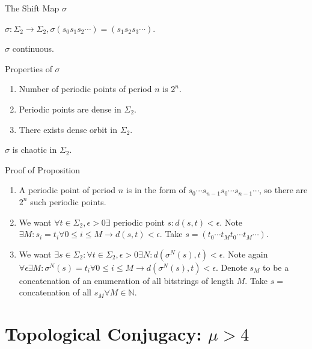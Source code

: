 \documentclass[aspectratio=169]{beamer}
\begin{document}
\begin{frame}{The Shift Map $\sigma$}
\begin{defn}
    $\sigma: \Sigma_2 \rightarrow \Sigma_2, \sigma(s_0s_1s_2\cdots) = (s_1s_2s_3\cdots)$. 
\end{defn}
\begin{prop}
    $\sigma$ continuous. 
\end{prop}
\end{frame}

\begin{frame}{Properties of $\sigma$}
\begin{prop}
\begin{enumerate}
    \item Number of periodic points of period $n$ is $2^n$. 
    \item Periodic points are dense in $\Sigma_2$. 
    \item There exists dense orbit in $\Sigma_2$. 
\end{enumerate}
\end{prop}
\begin{cor}
    $\sigma$ is chaotic in $\Sigma_2$. 
\end{cor}
\end{frame}

\begin{frame}{Proof of Proposition}
\begin{pf}
\begin{enumerate}
    \item A periodic point of period $n$ is in the form of $s_0\cdots s_{n-1}s_0\cdots s_{n-1}\cdots$, so there are $2^n$ such periodic points. 
    \item We want $\forall t\in \Sigma_2, \epsilon>0 \exists$ periodic point $s : d(s,t)<\epsilon$. Note $\exists M: s_i=t_i \forall 0\leq i\leq M \rightarrow d(s,t)<\epsilon$. Take $s = (t_0\cdots t_Mt_0\cdots t_M\cdots)$. 
    \item We want $\exists s\in\Sigma_2 : \forall t\in \Sigma_2, \epsilon>0 \exists N: d(\sigma^N(s),t) <\epsilon$. Note again $\forall\epsilon \exists M: \sigma^N(s)=t_i \forall 0\leq i\leq M \rightarrow d(\sigma^N(s),t)<\epsilon$. Denote $s_M$ to be a concatenation of an enumeration of all bitstrings of length $M$. Take $s=$ concatenation of all $s_M \forall M\in \mathbb{N}$. 
\end{enumerate}
\end{pf}
\end{frame}

\section{Topological Conjugacy: $\mu>4$}
\frame{\sectionpage}
\end{document}
